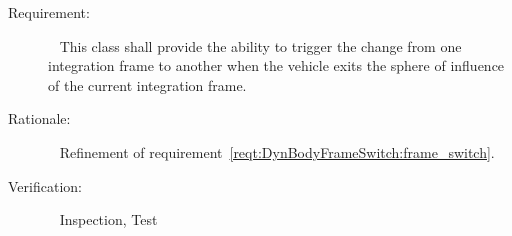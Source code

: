 \label{reqt:DynBodyFrameSwitch:frame_switch_on_exit}
\begin{description}
  \item[Requirement:]\ \newline
    This class shall provide the ability
    to trigger the change from one integration frame to another
    when the vehicle
    exits the sphere of influence of the current integration frame.
  \item[Rationale:]\ \newline
    Refinement of requirement~\ref{reqt:DynBodyFrameSwitch:frame_switch}.
  \item[Verification:]\ \newline
    Inspection, Test
\end{description}
